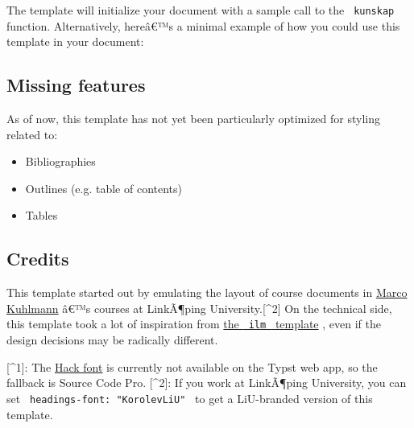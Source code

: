 The template will initialize your document with a sample call to the
\texttt{\ kunskap\ } function. Alternatively, hereâ€™s a minimal example
of how you could use this template in your document:

\begin{Shaded}
\begin{Highlighting}[]

\NormalTok{)}

\end{Highlighting}
\end{Shaded}

\subsection{Missing features}\label{missing-features}

As of now, this template has not yet been particularly optimized for
styling related to:

\begin{itemize}
\tightlist
\item
  Bibliographies
\item
  Outlines (e.g. table of contents)
\item
  Tables
\end{itemize}

\subsection{Credits}\label{credits}

This template started out by emulating the layout of course documents in
\href{https://liu.se/en/employee/marku61}{Marco Kuhlmann} â€™s courses
at LinkÃ¶ping University.{[}\^{}2{]} On the technical side, this
template took a lot of inspiration from
\href{https://github.com/talal/ilm/}{the \texttt{\ ilm\ } template} ,
even if the design decisions may be radically different.

{[}\^{}1{]}: The \href{https://github.com/source-foundry/Hack}{Hack
font} is currently not available on the Typst web app, so the fallback
is Source Code Pro. {[}\^{}2{]}: If you work at LinkÃ¶ping University,
you can set \texttt{\ headings-font:\ "KorolevLiU"\ } to get a
LiU-branded version of this template.

